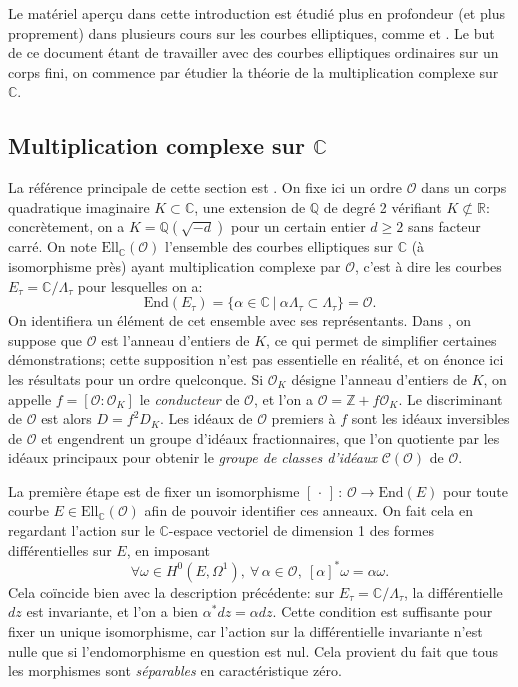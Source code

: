 \documentclass[11pt,a4paper]{article}
\newcommand{\Z}{\mathbb{Z}}
\newcommand{\C}{\mathbb{C}}
\newcommand{\Q}{\mathbb{Q}}
\newcommand{\R}{\mathbb{R}}
\renewcommand{\O}{\mathcal{O}}
\newcommand{\Cl}{\mathcal{C}}
\newcommand{\vers}{\longrightarrow}
\newcommand{\End}{\mathrm{End}}
\newcommand{\Ell}{\mathrm{Ell}}
\newcommand{\de}{\,:\,}
\renewcommand{\v}{\vspace{5mm}}
\theoremstyle{definition}
\begin{document}
\v

Le matériel aperçu dans cette introduction est étudié plus en profondeur (et plus proprement) dans plusieurs cours sur les courbes elliptiques, comme \cite{Nekovar} et \cite{Stroh}.
Le but de ce document étant de travailler avec des courbes elliptiques ordinaires sur un corps fini, on commence par étudier la théorie de la multiplication complexe sur $\C$.


\subsection{Multiplication complexe sur $\C$}


La référence principale de cette section est \cite{Sil2}. On fixe ici un ordre $\O$ dans un corps quadratique imaginaire $K\subset \C$, une extension de $\Q$ de degré 2 vérifiant $K \not\subset\R$: concrètement, on a $K=\Q(\sqrt{-d})$ pour un certain entier $d\geq 2$ sans facteur carré. On note $\Ell_\C(\O)$ l'ensemble des courbes elliptiques sur $\C$ (à isomorphisme près) ayant multiplication complexe par $\O$, c'est à dire les courbes $E_\tau = \C/\Lambda_\tau$ pour lesquelles on a:
$$\End(E_\tau) = \{\alpha\in \C\ |\ \alpha\Lambda_\tau \subset \Lambda_\tau\} = \O.$$
On identifiera un élément de cet ensemble avec ses représentants. Dans \cite{Sil2}, on suppose que $\O$ est l'anneau d'entiers de $K$, ce qui permet de simplifier certaines démonstrations; cette supposition n'est pas essentielle en réalité, et on énonce ici les résultats pour un ordre quelconque. %
Si $\O_K$ désigne l'anneau d'entiers de $K$, on appelle $f=[\O:\O_K]$ le \emph{conducteur} de $\O$, et l'on a $\O = \Z  + f \O_K$. Le discriminant de $\O$ est alors $D = f^2 D_K$. Les idéaux de $\O$ premiers à $f$ sont les idéaux inversibles de $\O$ et engendrent un groupe d'idéaux fractionnaires, que l'on quotiente par les idéaux principaux pour obtenir le \emph{groupe de classes d'idéaux} $\Cl(\O)$ de $\O$.
\v

La première étape est de fixer un isomorphisme $[\,\cdot\,]\de \O\vers \End(E)$ pour toute courbe $E\in \Ell_\C(\O)$ afin de pouvoir identifier ces anneaux. On fait cela en regardant l'action sur le $\C$-espace vectoriel de dimension 1 des formes différentielles sur $E$, en imposant
$$\forall \omega\in H^0(E,\Omega^1),\ \forall\,\alpha\in\O,\ [\alpha]^*\omega = \alpha \omega.$$
Cela coïncide bien avec la description précédente: sur $E_\tau = \C/\Lambda_\tau$, la différentielle $dz$ est invariante, et l'on a bien $\alpha^* dz = \alpha dz$. Cette condition est suffisante pour fixer un unique isomorphisme, car l'action sur la différentielle invariante n'est nulle que si l'endomorphisme en question est nul. Cela provient du fait que tous les morphismes sont \emph{séparables} en caractéristique zéro.
\end{document}
